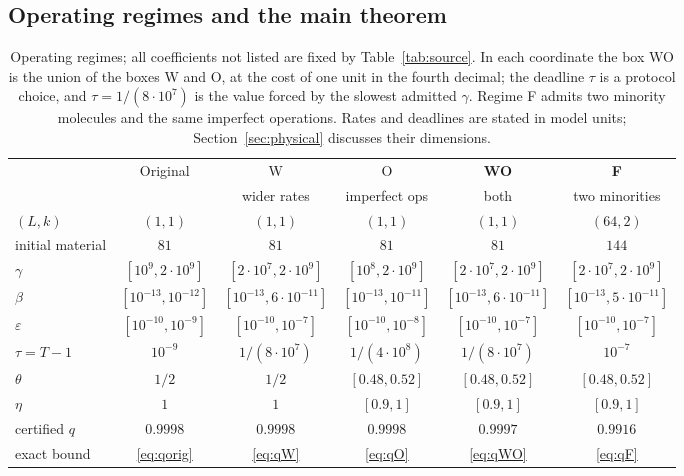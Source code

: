 \documentclass[11pt,a4paper]{article}
\theoremstyle{plain}
\theoremstyle{definition}
\theoremstyle{remark}
\newcommand{\eps}{\varepsilon}
\begin{document}
\subsection{Operating regimes and the main theorem}

\begin{table}[htbp]\centering\footnotesize
\setlength{\tabcolsep}{5pt}
\begin{tabular}{@{}lccccc@{}}\toprule
 & Original & W & O & \textbf{WO} & \textbf{F}\\
 & & wider rates & imperfect ops & both & two minorities\\\midrule
$(L,k)$ & $(1,1)$ & $(1,1)$ & $(1,1)$ & $(1,1)$ & $(64,2)$\\
initial material & $81$ & $81$ & $81$ & $81$ & $144$\\
$\gamma$ & $[10^{9},2\cdot10^{9}]$ & $[2\cdot10^{7},2\cdot10^{9}]$
        & $[10^{8},2\cdot10^{9}]$ & $[2\cdot10^{7},2\cdot10^{9}]$
        & $[2\cdot10^{7},2\cdot10^{9}]$\\
$\beta$ & $[10^{-13},10^{-12}]$ & $[10^{-13},6\cdot10^{-11}]$
        & $[10^{-13},10^{-11}]$ & $[10^{-13},6\cdot10^{-11}]$
        & $[10^{-13},5\cdot10^{-11}]$\\
$\eps$  & $[10^{-10},10^{-9}]$ & $[10^{-10},10^{-7}]$
        & $[10^{-10},10^{-8}]$ & $[10^{-10},10^{-7}]$
        & $[10^{-10},10^{-7}]$\\
$\tau=T-1$ & $10^{-9}$ & $1/(8\cdot10^{7})$ & $1/(4\cdot10^{8})$
        & $1/(8\cdot10^{7})$ & $10^{-7}$\\
$\theta$ & $1/2$ & $1/2$ & $[0.48,0.52]$ & $[0.48,0.52]$ & $[0.48,0.52]$\\
$\eta$ & $1$ & $1$ & $[0.9,1]$ & $[0.9,1]$ & $[0.9,1]$\\\midrule
certified $q$ & $0.9998$ & $0.9998$ & $0.9998$ & $\mathbf{0.9997}$
 & $\mathbf{0.9916}$\\
exact bound & \eqref{eq:qorig} & \eqref{eq:qW} & \eqref{eq:qO} & \eqref{eq:qWO}
 & \eqref{eq:qF}\\\bottomrule
\end{tabular}
\caption{Operating regimes; all coefficients not listed are fixed by
Table~\ref{tab:source}. In each coordinate the box WO is the union of the boxes W and O,
at the cost of one unit in the fourth decimal; the deadline $\tau$ is a protocol choice,
and $\tau=1/(8\cdot10^7)$ is the value forced by the slowest admitted $\gamma$. Regime F
admits two minority molecules and the same imperfect operations. Rates and deadlines are
stated in model units; Section~\ref{sec:physical} discusses their
dimensions.}\label{tab:regimes}
\end{table}
\end{document}
